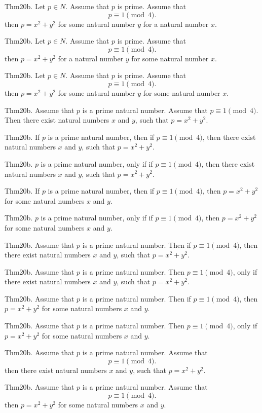 \documentclass{article}
\begin{document}
Thm20b. Let $p \in N$. Assume that $p$ is prime. Assume that $$p \equiv 1 \pmod{ 4}.$$ then $p = x ^{ 2}+ y ^{ 2}$ for some natural number $y$ for a natural number $x$.

Thm20b. Let $p \in N$. Assume that $p$ is prime. Assume that $$p \equiv 1 \pmod{ 4}.$$ then $p = x ^{ 2}+ y ^{ 2}$ for a natural number $y$ for some natural number $x$.

Thm20b. Let $p \in N$. Assume that $p$ is prime. Assume that $$p \equiv 1 \pmod{ 4}.$$ then $p = x ^{ 2}+ y ^{ 2}$ for some natural number $y$ for some natural number $x$.

Thm20b. Assume that $p$ is a prime natural number. Assume that $p \equiv 1 \pmod{ 4}$. Then there exist natural numbers $x$ and $y$, such that $p = x ^{ 2}+ y ^{ 2}$.

Thm20b. If $p$ is a prime natural number, then if $p \equiv 1 \pmod{ 4}$, then there exist natural numbers $x$ and $y$, such that $p = x ^{ 2}+ y ^{ 2}$.

Thm20b. $p$ is a prime natural number, only if if $p \equiv 1 \pmod{ 4}$, then there exist natural numbers $x$ and $y$, such that $p = x ^{ 2}+ y ^{ 2}$.

Thm20b. If $p$ is a prime natural number, then if $p \equiv 1 \pmod{ 4}$, then $p = x ^{ 2}+ y ^{ 2}$ for some natural numbers $x$ and $y$.

Thm20b. $p$ is a prime natural number, only if if $p \equiv 1 \pmod{ 4}$, then $p = x ^{ 2}+ y ^{ 2}$ for some natural numbers $x$ and $y$.

Thm20b. Assume that $p$ is a prime natural number. Then if $p \equiv 1 \pmod{ 4}$, then there exist natural numbers $x$ and $y$, such that $p = x ^{ 2}+ y ^{ 2}$.

Thm20b. Assume that $p$ is a prime natural number. Then $p \equiv 1 \pmod{ 4}$, only if there exist natural numbers $x$ and $y$, such that $p = x ^{ 2}+ y ^{ 2}$.

Thm20b. Assume that $p$ is a prime natural number. Then if $p \equiv 1 \pmod{ 4}$, then $p = x ^{ 2}+ y ^{ 2}$ for some natural numbers $x$ and $y$.

Thm20b. Assume that $p$ is a prime natural number. Then $p \equiv 1 \pmod{ 4}$, only if $p = x ^{ 2}+ y ^{ 2}$ for some natural numbers $x$ and $y$.

Thm20b. Assume that $p$ is a prime natural number. Assume that $$p \equiv 1 \pmod{ 4}.$$ then there exist natural numbers $x$ and $y$, such that $p = x ^{ 2}+ y ^{ 2}$.

Thm20b. Assume that $p$ is a prime natural number. Assume that $$p \equiv 1 \pmod{ 4}.$$ then $p = x ^{ 2}+ y ^{ 2}$ for some natural numbers $x$ and $y$.
\end{document}
